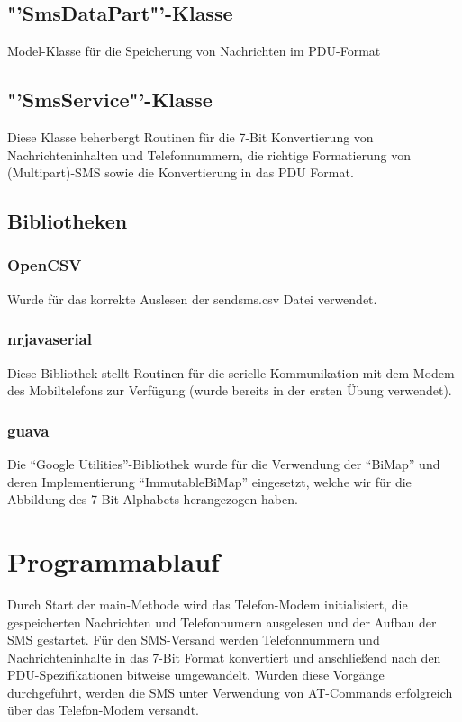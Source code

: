 \documentclass[paper=a4, fontsize=11pt]{scrartcl}
\begin{document}
\subsection{"'SmsDataPart"'-Klasse}
Model-Klasse für die Speicherung von Nachrichten im PDU-Format

\subsection{"'SmsService"'-Klasse}
Diese Klasse beherbergt Routinen für die 7-Bit Konvertierung von Nachrichteninhalten und Telefonnummern, die richtige Formatierung von (Multipart)-SMS sowie die Konvertierung in das PDU Format.

\subsection{Bibliotheken}

\subsubsection{OpenCSV}
Wurde für das korrekte Auslesen der sendsms.csv Datei verwendet.

\subsubsection{nrjavaserial}
Diese Bibliothek stellt Routinen für die serielle Kommunikation mit dem Modem des Mobiltelefons zur Verfügung (wurde bereits in der ersten Übung verwendet).

\subsubsection{guava}
Die "`Google Utilities"'-Bibliothek wurde für die Verwendung der "`BiMap"' und deren Implementierung "`ImmutableBiMap"' eingesetzt, welche wir für die Abbildung des 7-Bit Alphabets herangezogen haben.

\section{Programmablauf}
Durch Start der main-Methode wird das Telefon-Modem initialisiert, die gespeicherten Nachrichten und Telefonnumern ausgelesen und der Aufbau der SMS gestartet. Für den SMS-Versand werden Telefonnummern und Nachrichteninhalte in das 7-Bit Format konvertiert und anschließend nach den PDU-Spezifikationen bitweise umgewandelt. Wurden diese Vorgänge durchgeführt, werden die SMS unter Verwendung von AT-Commands erfolgreich über das Telefon-Modem versandt.
\end{document}
